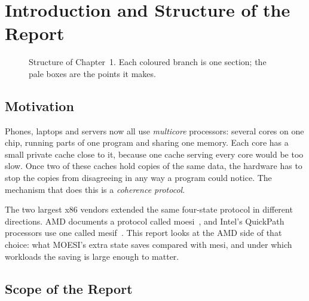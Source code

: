 \chapter{Introduction and Structure of the Report}
\label{ch:intro}

\begin{figure}[htbp]
\centering
{}
\caption[]{Structure of Chapter~1. Each coloured branch
is one section; the pale boxes are the points it makes.}
\label{fig:ch1-map}
\end{figure}

\section{Motivation}
\label{sec:intro-motivation}
%

Phones, laptops and servers now all use \emph{multicore}
processors: several cores on one chip, running parts of one program and sharing
one memory. Each core has a small private cache close to it, because one cache
serving every core would be too slow. Once two of these caches hold copies of the
same data, the hardware has to stop the copies from disagreeing in any way a
program could notice. The mechanism that does this is a
\emph{\gls{coherence} protocol}.

The two largest x86 vendors extended the same four-state protocol in different
directions. AMD documents a protocol called \gls{moesi}~\cite{amd64vol2}, and
Intel's QuickPath processors use one called \gls{mesif}~\cite{goodman2009mesif}.
This report looks at the AMD side of that choice: what MOESI's extra state saves
compared with \gls{mesi}, and under which workloads the saving is large enough to
matter.

\section{Scope of the Report}
\label{sec:intro-scope}
%

